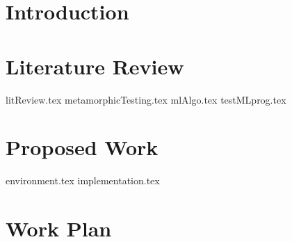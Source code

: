 \documentclass[print,ms]{style/unothesis}
\begin{document}
	\chapter{Introduction}

	\chapter{Literature Review}
  	{litReview.tex}
	{metamorphicTesting.tex}
	{mlAlgo.tex}
	{testMLprog.tex}

	\chapter{Proposed Work}
	{environment.tex}
	{implementation.tex}

	\chapter{Work Plan}


\backmatter

\appendix



	\nocite{*}
	
	
\end{document}
